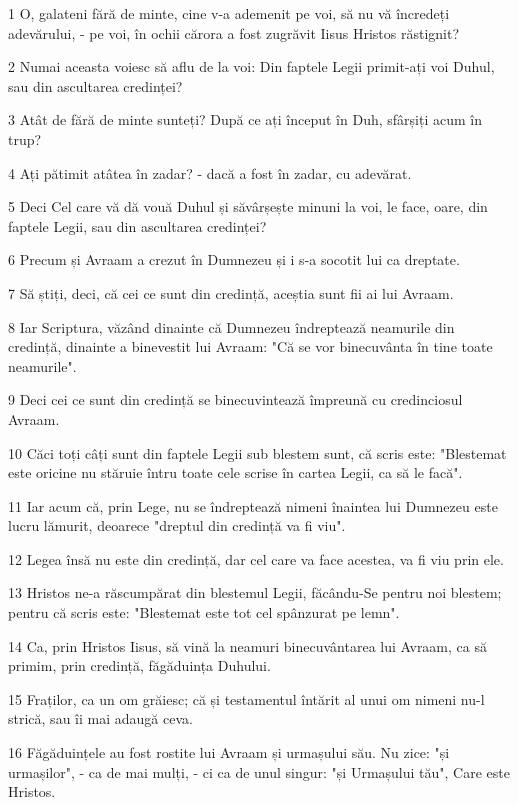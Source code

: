 \par 1 O, galateni fără de minte, cine v-a ademenit pe voi, să nu vă încredeți adevărului, - pe voi, în ochii cărora a fost zugrăvit Iisus Hristos răstignit?
\par 2 Numai aceasta voiesc să aflu de la voi: Din faptele Legii primit-ați voi Duhul, sau din ascultarea credinței?
\par 3 Atât de fără de minte sunteți? După ce ați început în Duh, sfârșiți acum în trup?
\par 4 Ați pătimit atâtea în zadar? - dacă a fost în zadar, cu adevărat.
\par 5 Deci Cel care vă dă vouă Duhul și săvârșește minuni la voi, le face, oare, din faptele Legii, sau din ascultarea credinței?
\par 6 Precum și Avraam a crezut în Dumnezeu și i s-a socotit lui ca dreptate.
\par 7 Să știți, deci, că cei ce sunt din credință, aceștia sunt fii ai lui Avraam.
\par 8 Iar Scriptura, văzând dinainte că Dumnezeu îndreptează neamurile din credință, dinainte a binevestit lui Avraam: "Că se vor binecuvânta în tine toate neamurile".
\par 9 Deci cei ce sunt din credință se binecuvintează împreună cu credinciosul Avraam.
\par 10 Căci toți câți sunt din faptele Legii sub blestem sunt, că scris este: "Blestemat este oricine nu stăruie întru toate cele scrise în cartea Legii, ca să le facă".
\par 11 Iar acum că, prin Lege, nu se îndreptează nimeni înaintea lui Dumnezeu este lucru lămurit, deoarece "dreptul din credință va fi viu".
\par 12 Legea însă nu este din credință, dar cel care va face acestea, va fi viu prin ele.
\par 13 Hristos ne-a răscumpărat din blestemul Legii, făcându-Se pentru noi blestem; pentru că scris este: "Blestemat este tot cel spânzurat pe lemn".
\par 14 Ca, prin Hristos Iisus, să vină la neamuri binecuvântarea lui Avraam, ca să primim, prin credință, făgăduința Duhului.
\par 15 Fraților, ca un om grăiesc; că și testamentul întărit al unui om nimeni nu-l strică, sau îi mai adaugă ceva.
\par 16 Făgăduințele au fost rostite lui Avraam și urmașului său. Nu zice: "și urmașilor", - ca de mai mulți, - ci ca de unul singur: "și Urmașului tău", Care este Hristos.
